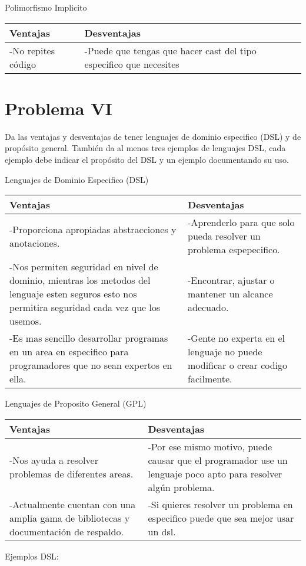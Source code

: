 \documentclass{article}
\begin{document}
\begin{center}
Polimorfismo Implicito
\end{center}
\begin{tabularx}{\textwidth}{X|X}
	  \textbf{Ventajas} & \textbf{Desventajas} \\
	\hline
	-No repites código & -Puede que tengas que hacer cast del tipo especifico que necesites \\
\end{tabularx}


\section*{Problema VI}
Da las ventajas y desventajas de tener lenguajes de dominio especifico (DSL)
y de propósito general. También da al menos tres ejemplos de lenguajes DSL,
cada ejemplo debe indicar el propósito del DSL y un ejemplo documentando su uso.
\\
\begin{center}
Lenguajes de Dominio Especifico (DSL)
\end{center}
\begin{tabularx}{\textwidth}{X|X}
	  \textbf{Ventajas} & \textbf{Desventajas} \\
	\hline
	-Proporciona apropiadas abstracciones y anotaciones. & -Aprenderlo para que solo pueda resolver un problema espepecifico.\\
	-Nos permiten seguridad en nivel de dominio, mientras los metodos del lenguaje esten seguros esto nos permitira seguridad cada vez que los usemos. & -Encontrar, ajustar o mantener un alcance adecuado.\\
	-Es mas sencillo desarrollar programas en un area en especifico para programadores que no sean expertos en ella. & -Gente no experta en el lenguaje no puede modificar o crear codigo facilmente.\\
\end{tabularx}

\begin{center}
Lenguajes de Proposito General (GPL)
\end{center}
\begin{tabularx}{\textwidth}{X|X}
	  \textbf{Ventajas} & \textbf{Desventajas} \\
	\hline
	-Nos ayuda a resolver problemas de diferentes areas. & -Por ese mismo motivo, puede causar que el programador use un lenguaje poco apto para resolver algún problema.\\
	-Actualmente cuentan con una amplia gama de bibliotecas y documentación de respaldo. & -Si quieres resolver un problema en especifico puede que sea mejor usar un dsl.\\
	
\end{tabularx}
\begin{center}
Ejemplos DSL:
\end{center}
\end{document}

